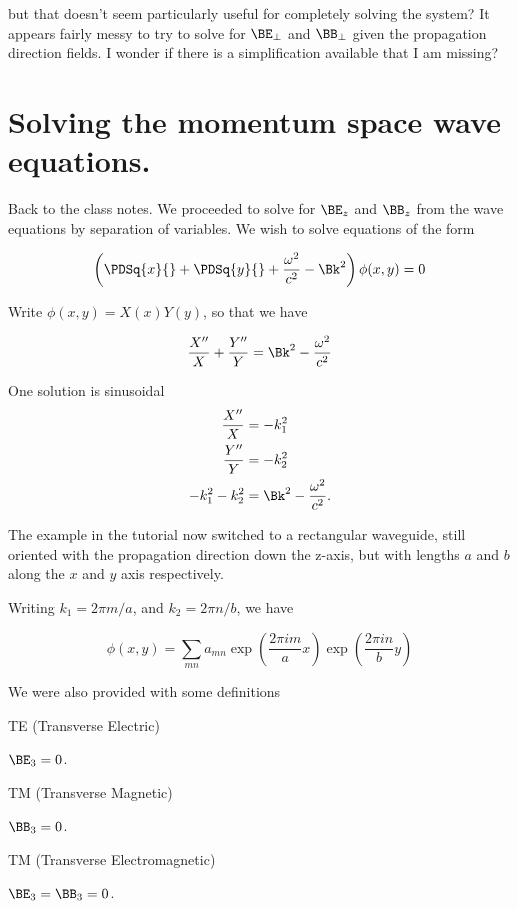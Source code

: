but that doesn't seem particularly useful for completely solving the system?  It appears fairly messy to try to solve for $\BE_\perp$ and $\BB_\perp$ given the propagation direction fields.  I wonder if there is a simplification available that I am missing?

\section{Solving the momentum space wave equations.}

Back to the class notes.  We proceeded to solve for $\BE_z$ and $\BB_z$ from the wave equations by separation of variables.  We wish to solve equations of the form

\begin{equation}\label{eqn:relativisticElectrodynamicsT4:360}
\left( \PDSq{x}{} + \PDSq{y}{} + \frac{\omega^2}{c^2} - \Bk^2 \right) \phi(x,y) = 0
\end{equation}

Write $\phi(x,y) = X(x) Y(y)$, so that we have

\begin{equation}\label{eqn:relativisticElectrodynamicsT4:380}
\frac{X''}{X} + \frac{Y''}{Y} = \Bk^2 - \frac{\omega^2}{c^2}
\end{equation}

One solution is sinusoidal
\begin{align}\label{eqn:relativisticElectrodynamicsT4:400}
\frac{X''}{X} &= -k_1^2 \\
\frac{Y''}{Y} &= -k_2^2 \\
-k_1^2 - k_2^2
&= \Bk^2 - \frac{\omega^2}{c^2}.
\end{align}

The example in the tutorial now switched to a rectangular waveguide, still oriented with the propagation direction down the z-axis, but with lengths $a$ and $b$ along the $x$ and $y$ axis respectively.

Writing $k_1 = 2\pi m/a$, and $k_2 = 2 \pi n/ b$, we have

\begin{equation}\label{eqn:relativisticElectrodynamicsT4:420}
\phi(x, y) = \sum_{m n} a_{m n} 
\exp\left( \frac{2 \pi i m}{a} x \right)
\exp\left( \frac{2 \pi i n}{b} y \right)
\end{equation}

We were also provided with some definitions

\begin{definition}TE (Transverse Electric)

$\BE_3 = 0$.
\end{definition}
\begin{definition}
TM (Transverse Magnetic)

$\BB_3 = 0$.
\end{definition}
\begin{definition}
TM (Transverse Electromagnetic)

$\BE_3 = \BB_3 = 0$.
\end{definition}

